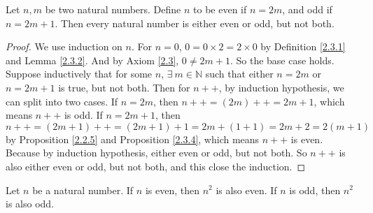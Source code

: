 \begin{additional corollary}\label{ac 4.4.1}
Let \(n, m\) be two natural numbers.
Define \(n\) to be even if \(n = 2m\), and odd if \(n = 2m + 1\).
Then every natural number is either even or odd, but not both.
\end{additional corollary}

\begin{proof}
We use induction on \(n\).
For \(n = 0\), \(0 = 0 \times 2 = 2 \times 0\) by Definition \ref{2.3.1} and Lemma \ref{2.3.2}.
And by Axiom \ref{2.3}, \(0 \neq 2m + 1\).
So the base case holds.
Suppose inductively that for some \(n\), \(\exists\ m \in \mathds{N}\) such that either \(n = 2m\) or \(n = 2m + 1\) is true, but not both.
Then for \(n++\), by induction hypothesis, we can split into two cases.
If \(n = 2m\), then \(n++ = (2m)++ = 2m + 1\), which means \(n++\) is odd.
If \(n = 2m + 1\), then \(n++ = (2m + 1)++ = (2m + 1) + 1 = 2m + (1 + 1) = 2m + 2 = 2(m + 1)\) by Proposition \ref{2.2.5} and Proposition \ref{2.3.4}, which means \(n++\) is even.
Because by induction hypothesis, either even or odd, but not both.
So \(n++\) is also either even or odd, but not both, and this close the induction.
\end{proof}

\begin{additional corollary}\label{ac 4.4.2}
Let \(n\) be a natural number.
If \(n\) is even, then \(n^2\) is also even.
If \(n\) is odd, then \(n^2\) is also odd.
\end{additional corollary}

